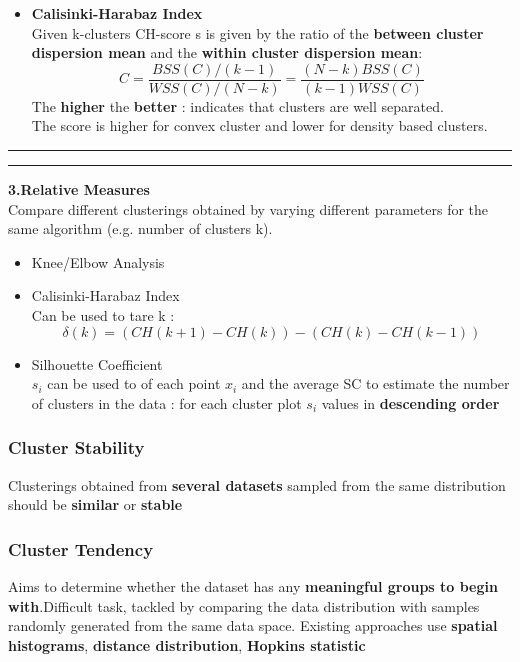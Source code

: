 \begin{description}
\begin{itemize}
\item \textbf{Calisinki-Harabaz Index}\\
Given k-clusters CH-score s is given by the ratio of the \textbf{between cluster dispersion mean} and the \textbf{within cluster dispersion mean}:
$$ C = \frac{BSS(C) / (k-1)}{WSS(C) / (N-k)}= \frac{(N-k)BSS(C)}{(k-1)WSS(C)}$$
The \textbf{higher} the \textbf{better} : indicates that clusters are well separated.\\
The score is higher for convex cluster and lower for density based clusters.
\end{itemize}

\begin{center}
\rule{1\textwidth}{.1pt}
\rule{1\textwidth}{.1pt}
\end{center}

\item \textbf{3.Relative Measures}\\
Compare different clusterings obtained by varying different parameters for the same algorithm (e.g. number of clusters k).
\begin{itemize}
\item Knee/Elbow Analysis
\item Calisinki-Harabaz Index\\
Can be used to tare k : 
$$ \delta(k) = (CH(k+1)-CH(k)) - (CH(k)-CH(k-1))$$
\item Silhouette Coefficient\\
$s_i$ can be used to of each point $x_i$ and the average SC to estimate the number of clusters in the data : for each cluster plot $s_i$ values in \textbf{descending order}
\end{itemize}
\end{description}

\subsubsection{Cluster Stability}
Clusterings obtained from \textbf{several datasets} sampled from the same distribution should be \textbf{similar} or \textbf{stable}

\subsubsection{Cluster Tendency}
Aims to determine whether the dataset has any \textbf{meaningful groups to begin with}.Difficult task, tackled by comparing the data distribution with samples randomly generated from the same data space. Existing approaches use \textbf{spatial histograms}, \textbf{distance distribution}, \textbf{Hopkins statistic}